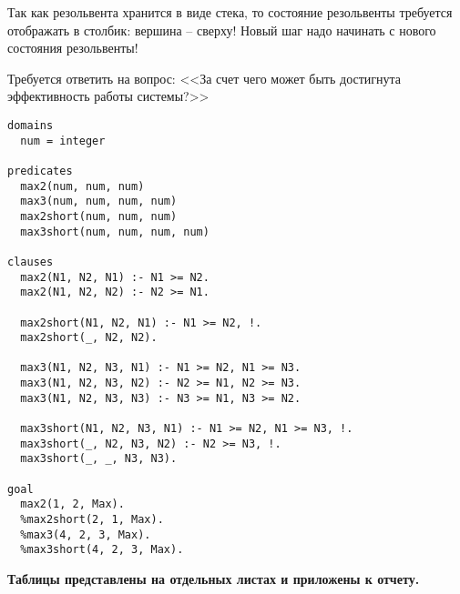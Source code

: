 Так как резольвента хранится в виде стека, то состояние резольвенты требуется отображать в столбик: вершина – сверху! Новый шаг надо начинать с нового состояния резольвенты!

Требуется ответить на вопрос: <<За счет чего может быть достигнута эффективность работы системы?>>

\begin{lstlisting}
domains
  num = integer

predicates
  max2(num, num, num)
  max3(num, num, num, num)
  max2short(num, num, num)
  max3short(num, num, num, num)
  
clauses
  max2(N1, N2, N1) :- N1 >= N2.
  max2(N1, N2, N2) :- N2 >= N1.

  max2short(N1, N2, N1) :- N1 >= N2, !.
  max2short(_, N2, N2).

  max3(N1, N2, N3, N1) :- N1 >= N2, N1 >= N3.
  max3(N1, N2, N3, N2) :- N2 >= N1, N2 >= N3.
  max3(N1, N2, N3, N3) :- N3 >= N1, N3 >= N2.

  max3short(N1, N2, N3, N1) :- N1 >= N2, N1 >= N3, !.
  max3short(_, N2, N3, N2) :- N2 >= N3, !.
  max3short(_, _, N3, N3).

goal
  max2(1, 2, Max).
  %max2short(2, 1, Max).
  %max3(4, 2, 3, Max).
  %max3short(4, 2, 3, Max).
\end{lstlisting}

\textbf{Таблицы представлены на отдельных листах и приложены к отчету.}
